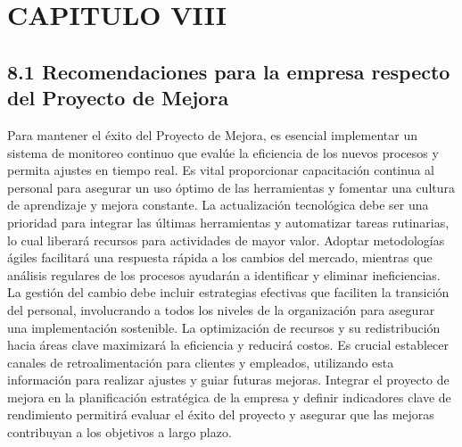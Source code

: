 \newpage
\section{CAPITULO VIII}
\subsection{8.1 Recomendaciones para la empresa respecto del Proyecto de Mejora}

Para mantener el éxito del Proyecto de Mejora, es esencial implementar un sistema de monitoreo continuo que evalúe la eficiencia de los nuevos procesos y permita ajustes en tiempo real. Es vital proporcionar capacitación continua al personal para asegurar un uso óptimo de las herramientas y fomentar una cultura de aprendizaje y mejora constante. La actualización tecnológica debe ser una prioridad para integrar las últimas herramientas y automatizar tareas rutinarias, lo cual liberará recursos para actividades de mayor valor. Adoptar metodologías ágiles facilitará una respuesta rápida a los cambios del mercado, mientras que análisis regulares de los procesos ayudarán a identificar y eliminar ineficiencias. La gestión del cambio debe incluir estrategias efectivas que faciliten la transición del personal, involucrando a todos los niveles de la organización para asegurar una implementación sostenible. La optimización de recursos y su redistribución hacia áreas clave maximizará la eficiencia y reducirá costos. Es crucial establecer canales de retroalimentación para clientes y empleados, utilizando esta información para realizar ajustes y guiar futuras mejoras. Integrar el proyecto de mejora en la planificación estratégica de la empresa y definir indicadores clave de rendimiento permitirá evaluar el éxito del proyecto y asegurar que las mejoras contribuyan a los objetivos a largo plazo.


